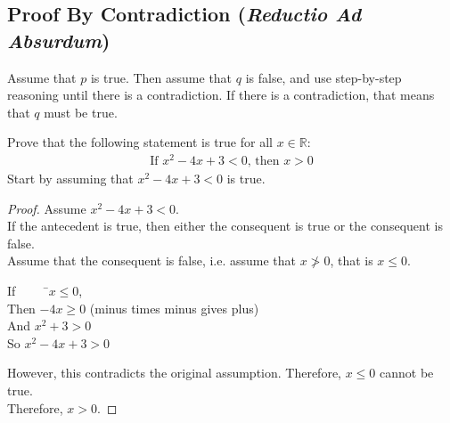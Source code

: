 \documentclass[../notes.tex]{subfiles}
\begin{document}
			\subsection[Proof By Contradiction]{Proof By Contradiction (\emph{Reductio Ad Absurdum})}
				Assume that $p$ is true. Then assume that $q$ is false, and use step-by-step reasoning until there is a contradiction. If there is a contradiction, that means that $q$ must be true.
				\begin{example}
					Prove that the following statement is true for all $x \in \mathbb{R}$:
					\begin{align*}
						\text{If } x^{2} - 4x + 3 < 0 \text{, then } x > 0
					\end{align*}
					Start by assuming that $x^{2} - 4x + 3 < 0$ is true.
					\begin{proof}
						Assume $x^{2} - 4x + 3 < 0$.\\
						If the antecedent is true, then either the consequent is true or the consequent is false.\\
						Assume that the consequent is false, i.e. assume that $x \not > 0$, that is $x \leq 0$.
						\begin{tabbing}
							If $\qquad$ \=$x \leq 0$,\\
							Then \>$-4x \geq 0$ (minus times minus gives plus)\\
							And \>$x^{2} + 3 > 0$\\
							So \>$x^{2} - 4x + 3 > 0$
						\end{tabbing}
						However, this contradicts the original assumption. Therefore, $x \leq 0$ cannot be true.\\
						Therefore, $x > 0$.
					\end{proof}
				\end{example}
\end{document}
